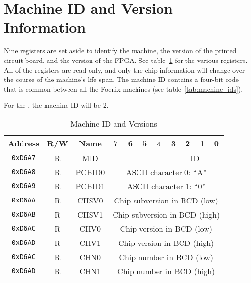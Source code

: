 \section{Machine ID and Version Information}

Nine registers are set aside to identify the machine, the version of the printed circuit board, and the version of the FPGA. See table~\ref{tab:machine_id_ver} for the various registers. All of the registers are read-only, and only the chip information will change over the course of the machine's life span. The machine ID contains a four-bit code that is common between all the Foenix machines (see table~\ref{tab:machine_ids}).

For the \jr, the machine ID will be 2.

\begin{table}[ht]
    \begin{center}
        \begin{tabular}{|c|c|c|c|c|c|c|c|c|c|c|} \hline
            Address & R/W & Name & 7 & 6 & 5 & 4 & 3 & 2 & 1 & 0 \\\hline\hline
            \verb+0xD6A7+ & R & MID & \multicolumn{4}{|c|}{---} & \multicolumn{4}{|c|}{ID} \\ \hline

            \verb+0xD6A8+ & R & PCBID0 & \multicolumn{8}{|c|}{ASCII character 0: ``A''} \\ \hline
            \verb+0xD6A9+ & R & PCBID1 & \multicolumn{8}{|c|}{ASCII character 1: ``0''} \\ \hline

            \verb+0xD6AA+ & R & CHSV0 & \multicolumn{8}{|c|}{Chip subversion in BCD (low)} \\ \hline
            \verb+0xD6AB+ & R & CHSV1 & \multicolumn{8}{|c|}{Chip subversion in BCD (high)} \\ \hline
            \verb+0xD6AC+ & R & CHV0 & \multicolumn{8}{|c|}{Chip version in BCD (low)} \\ \hline
            \verb+0xD6AD+ & R & CHV1 & \multicolumn{8}{|c|}{Chip version in BCD (high)} \\ \hline
            \verb+0xD6AC+ & R & CHN0 & \multicolumn{8}{|c|}{Chip number in BCD (low)} \\ \hline
            \verb+0xD6AD+ & R & CHN1 & \multicolumn{8}{|c|}{Chip number in BCD (high)} \\ \hline
        \end{tabular}
    \end{center}
    \caption{Machine ID and Versions}
    \label{tab:machine_id_ver}
\end{table}

